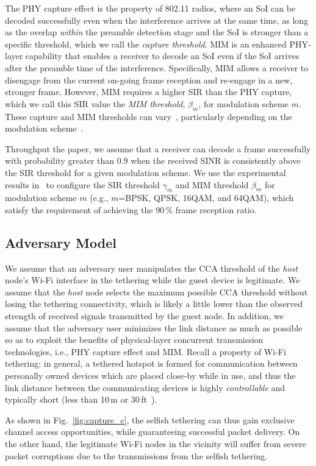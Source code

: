 %
%
The PHY capture effect is the property of 802.11 radios, where
an SoI can be decoded successfully even when the interference arrives
at the same time, as long as the overlap \emph{within} the preamble
detection stage and the SoI is stronger than a specific threshold,
which we call the \emph{capture threshold}.
%
MIM is an enhanced PHY-layer capability that enables a receiver to
decode an SoI even if the SoI arrives after the preamble time of
the interference.
%
Specifically, MIM allows a receiver to disengage from the current
on-going frame reception and re-engage in a new, stronger frame.
However, MIM requires a higher SIR than the PHY capture, which we call
this SIR value the \emph{MIM threshold}, $\beta_{m}$, for modulation
scheme $m$.
%
These capture and MIM thresholds can vary~\cite{Ware:Dut00,
jlee:ychoi07}, particularly depending on the modulation
scheme~\cite{jlee:ychoi07}.

Throughput the paper, we assume that a receiver can decode a frame
successfully with probability greater than 0.9 when the received
SINR is consistently above the SIR threshold for a given modulation scheme.
%
We use the experimental results in~\cite{jlee:ychoi07} to configure
the SIR threshold $\gamma_{m}$ and MIM threshold $\beta_{m}$ for
modulation scheme $m$ (e.g., $m$=BPSK, QPSK, 16QAM, and 64QAM), which
satisfy the requirement of achieving the 90\,\% frame reception ratio.


\subsection{Adversary Model}
%
We assume that an adversary user manipulates the CCA threshold of the
\emph{host} node's Wi-Fi interface in the tethering while the guest
device is legitimate.
%
We assume that the \emph{host} node selects the maximum possible
CCA threshold without losing the tethering connectivity, which
is likely a little lower than the observed strength of received
signals transmitted by the guest node.
%
In addition, we assume that the adversary user minimizes the link
distance as much as possible so as to exploit the benefits of
physical-layer concurrent transmission technologies, i.e., PHY capture
effect and MIM.
%
Recall a property of Wi-Fi tethering: in general, a tethered hotspot
is formed for communication between personally owned devices which
are placed close-by while in use, and thus the link distance between the
communicating devices is highly \emph{controllable} and typically short
(less than 10\,m or 30\,ft~\cite{Choi:Shin11}).

As shown in Fig.~\ref{fig:capture_c}, the selfish tethering can thus gain exclusive
channel access opportunities, while guaranteeing successful packet
delivery. On the other hand, the legitimate Wi-Fi nodes in the
vicinity will suffer from severe packet corruptions due to the
transmissions from the selfish tethering.

